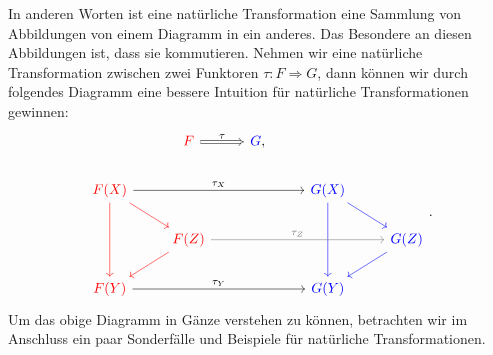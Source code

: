 \documentclass{article}
\theoremstyle{plain}
\theoremstyle{definition}
\theoremstyle{remark}
\begin{document}
In anderen Worten ist eine natürliche Transformation eine Sammlung von Abbildungen von einem Diagramm in ein anderes. Das Besondere an diesen Abbildungen ist, dass sie kommutieren. Nehmen wir eine natürliche Transformation zwischen zwei Funktoren $\tau: F \Longrightarrow G$, dann können wir durch folgendes Diagramm eine bessere Intuition für natürliche Transformationen gewinnen:
\begin{equation}
	\begin{tikzcd}
	                                                   & {\color{red}F} \arrow[r, Rightarrow, "\tau"]                 & {\color{blue}G}, &                            &                 \\
	{\color{red}F(X)} \arrow[dd, red] \arrow[rd, red] \arrow[rrr, "\tau_{X}"] &                                         &   & {\color{blue}G(X)} \arrow[rd, blue] \arrow[dd, blue] &                 \\
	                                                   & {\color{red}F(Z)} \arrow[ld, red] \arrow[rrr, "\tau_{Z}", gray] &   &                            & {\color{blue}G(Z)} \arrow[ld, blue] \\
	{\color{red}F(Y)} \arrow[rrr, "\tau_{Y}"]                       &                                         &   & {\color{blue}G(Y)}                       &                
	\end{tikzcd}.
\end{equation}
Um das obige Diagramm in Gänze verstehen zu können, betrachten wir im Anschluss ein paar Sonderfälle und Beispiele für natürliche Transformationen.
\end{document}

